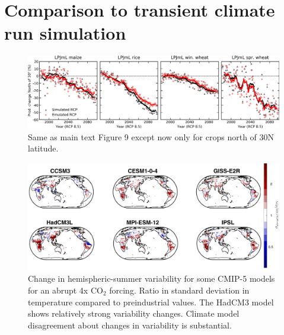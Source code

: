 \documentclass[10pt]{article}
\begin{document}
{{\clearpage
\section{Comparison to transient climate run simulation}
\begin{figure}[h!]
  \centering
  \includegraphics[width = 16.3cm]{LPJMLRCP85comp_30N.png}
  \caption{
  Same as main text Figure 9 except now only for crops north of 30N latitude.
  }
  \label{fig:lpjmlrcp}
\end{figure}

\begin{figure}[h!]
  \centering
  \includegraphics[width = 16.3cm]{tas_Amon_LRM6_abrupt4x_control_LF_maps_JJA_final.png}
  \caption{
  Change in hemispheric-summer variability for some CMIP-5 models for an abrupt 4x CO$_2$ forcing. Ratio in standard deviation in temperature compared to preindustrial values. 
  The HadCM3 model shows relatively strong variability changes. Climate model disagreement about changes in variability is substantial.
  }
  \label{fig:lpjmlrcp}
\end{figure}


\clearpage
}}
\end{document}
